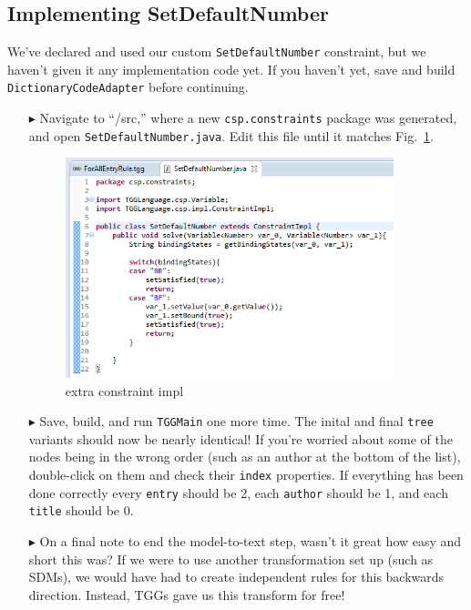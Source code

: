 \newpage
\hypertarget{common cspConstraint}{}
\subsection{Implementing SetDefaultNumber}
\genHeader

We've declared and used our custom \texttt{SetDefaultNumber} constraint, but we haven't given it any implementation code yet. If you haven't yet, save and build
\texttt{DictionaryCodeAdapter} before continuing.

\begin{itemize}

\item[$\blacktriangleright$] Navigate to ``/src,'' where a new \texttt{csp.constraints} package was generated, and open \texttt{SetDefaultNumber.java}. Edit
this file until it matches Fig.~\ref{eclipse:setDefaultImpl}.

\begin{figure}[htbp]
\begin{center}
  \includegraphics[width=0.9\textwidth]{eclipse_setDefaultNumberImplementation}
  \caption{extra constraint impl}
  \label{eclipse:setDefaultImpl}
\end{center}
\end{figure}

\item[$\blacktriangleright$] Save, build, and run \texttt{TGGMain} one more time. The inital and final \texttt{tree} variants should now be nearly identical! If
you're worried about some of the nodes being in the wrong order (such as an author at the bottom of the list), double-click on them and check their
\texttt{index} properties. If everything has been done correctly every \texttt{entry} should be 2, each \texttt{author} should be 1, and each \texttt{title}
should be 0.

\item[$\blacktriangleright$] On a final note to end the model-to-text step, wasn't it great how easy and short this was? If we were to use another
transformation set up (such as SDMs), we would have had to create independent rules for this backwards direction. Instead, TGGs gave us this transform for free!

\end{itemize}
